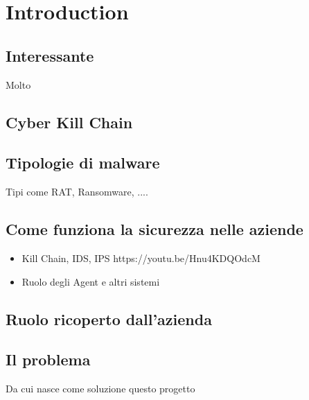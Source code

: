 \chapter{Introduction}

\section{Interessante}
Molto \cite{aws_inforce_malware}

\section{Cyber Kill Chain}

\section{Tipologie di malware}
Tipi come RAT, Ransomware, ....

\section{Come funziona la sicurezza nelle aziende}
\begin{itemize}
    \item Kill Chain, IDS, IPS https://youtu.be/Hnu4KDQOdcM
    \item Ruolo degli Agent e altri sistemi
\end{itemize}

\section{Ruolo ricoperto dall'azienda}

\section{Il problema}
Da cui nasce come soluzione questo progetto